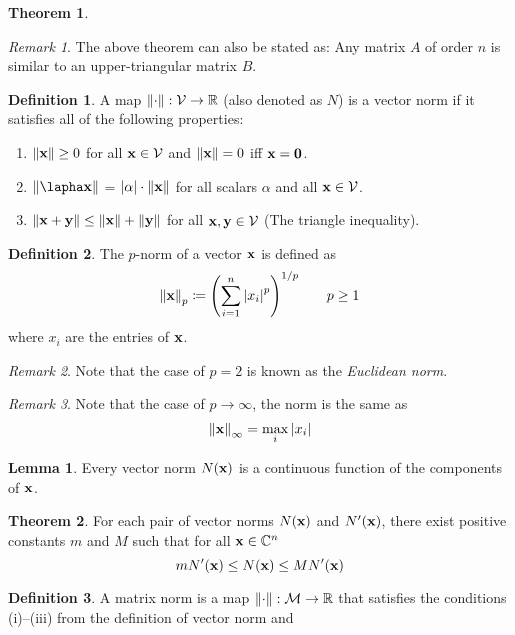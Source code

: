 \documentclass[11pt,letterpaper]{article}
\numberwithin{figure}{section} %
\newcommand{\Reals}{\mathbb{R}}
\newcommand{\Complex}{\mathbb{C}}
\newcommand{\keyword}[1]{\colorbox{cyan!20!}{#1}}
\theoremstyle{definition}
\newtheorem{theorem}{Theorem}[subsection]
\theoremstyle{definition}
\newtheorem{lemma}{Lemma}[subsection]
\theoremstyle{definition}
\newtheorem{definition}{Definition}[subsection]
\theoremstyle{definition}
\theoremstyle{remark}
\newtheorem*{remark}{Remark}
\theoremstyle{remark}
\theoremstyle{definition}
\theoremstyle{remark}
\theoremstyle{remark}
\begin{document}
\begin{multicols*}{3}
\begin{theorem}
\end{theorem}
\begin{remark}
	The above theorem can also be stated as: Any matrix $A$ of order $n$ is
	similar to an upper-triangular matrix $B$.
\end{remark}
\begin{definition}
	A map $\norm{\cdot} : \mathcal{V} \to \Reals$ (also denoted as $N$) is a
	\keyword{vector norm} if it satisfies all of the following properties:
	\begin{enumerate}[label={(\roman*)}]
		\item $\norm{\vb{x}} \geq 0$ for all $\vb{x} \in \mathcal{V}$ and
			$\norm{\vb{x}} = 0$ iff $\vb{x} = \vb{0}$.
		\item $\norm{\lapha \vb{x}}$ = $\abs{\alpha}\cdot \norm{\vb{x}}$ for all 
			scalars $\alpha$ and all $\vb{x} \in \mathcal{V}$.
		\item $\norm{\vb{x} + \vb{y}} \leq \norm{\vb{x}} + \norm{\vb{y}}$ for all
			$\vb{x},\vb{y} \in \mathcal{V}$ (The triangle inequality).
	\end{enumerate}
\end{definition}
\begin{definition}
	The \keyword{$p$-norm} of a vector $\vb{x}$ is defined as 
	\[
		\norm{\vb{x}}_p \coloneqq \pqty{\sum_{i=1}^n \abs{x_i}^p}^{1/p} \qquad p \geq 1
	\]
	where $x_i$ are the entries of $\vb{x}$.
\end{definition}
\begin{remark}
	Note that the case of $p=2$ is known as the \textit{Euclidean norm}.
\end{remark}
\begin{remark}
	Note that the case of $p\to\infty$, the norm is the same as
	\[
		\norm{\vb{x}}_\infty = \max_i \abs{x_i}
	\]
\end{remark}
\begin{lemma}\label{lem:norm_cont_func}
	Every vector norm $N(\vb{x})$ is a continuous function of the components of
	$\vb{x}$.
\end{lemma}
\begin{theorem}\label{thm:norm_eqiv}
	For each pair of vector norms $N(\vb{x})$ and $N'(\vb{x})$, there exist
	positive constants $m$ and $M$ such that for all $\vb{x} \in \Complex^n$
	\[
		mN'(\vb{x}) \leq N(\vb{x}) \leq MN'(\vb{x})
	\]
\end{theorem}
\begin{definition}
	A \keyword{matrix norm} is a map $\norm{\cdot} : \mathcal{M} \to \Reals$ that
	satisfies the conditions (i)--(iii) from the definition of vector norm and

\end{definition}
\end{multicols*}
\end{document}
